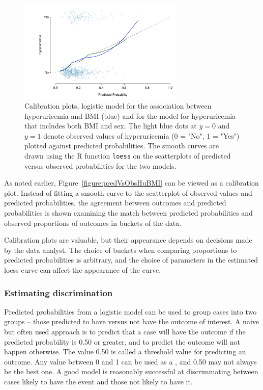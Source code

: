 \begin{figure}[!tbh]
  \centering
  \includegraphics[width=0.70\textwidth]
  {ch_logistic_regression_oi_biostat/figures/calibrationHuBMISex/calibrationHuBMISex.pdf}
    \caption{Calibration plots, logistic model for the association between hyperuricemia and BMI (blue) and for the model for hyperuricemia that includes both BMI and sex. The light blue dots at  $y = 0$ and $y = 1$ denote observed values of hyperuricemia (0 = "No", 1 = "Yes") plotted against predicted probabilities.   The smooth curves are drawn using the \textsf{R} function \texttt{loess} on the scatterplots of predicted versus observed probabilities for the two models.}
   \label{figure:calibrationHuBMISex}
\end{figure}

  As noted earlier, Figure~\ref{figure:predVsObsHuBMI} can be viewed as a calibration plot.  Instead of fitting a smooth curve to the scatterplot of observed values and predicted probabilities,  the agreement between outcomes and predicted probabilities is shown examining the match between predicted probabilities and observed proportions of outcomes in buckets of the data.

  Calibration plots are valuable, but their appearance depends on decisions made by the data analyst.  The choice of buckets when comparing proportions to predicted probabilities is arbitrary, and the choice of parameters in the estimated loess curve can affect the appearance of the curve. 
   
\subsubsection{Estimating discrimination}

Predicted probabilities from a logistic model can be used to group cases into two groups -- those predicted to have versus not have the outcome of interest.  A naive but often used approach is to predict that a case will have the outcome if the predicted probability is 0.50 or greater, and to predict the outcome will not happen otherwise.  The value 0.50 is called a threshold value for predicting an outcome.  Any value between 0 and 1 can be used as a , and 0.50 may not always be the best one.  A good model is reasonably successful at discriminating between cases likely to have the event and those not likely to have it.

